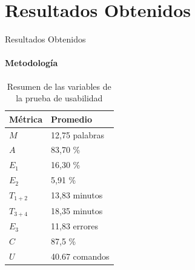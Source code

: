 \section{Resultados Obtenidos}

\begin{frame}{Resultados Obtenidos}
\framesubtitle{Metodolog\'ia}

\begin{table}[H]
\centering
\footnotesize
\caption{Resumen de las variables de la prueba de usabilidad}
\begin{tabular}{|p{1.2cm}|p{2.4cm}|}
\hline
M\'etrica  &   Promedio \\
\hline
$M$ &       12,75  palabras  \\
$A$  &      83,70 \%     \\
$E_1$ &     16,30 \%  \\
$E_2$  &    5,91  \%  \\
$T_{1+2}$ & 13,83  minutos  \\
$T_{3+4}$ & 18,35  minutos  \\
$E_3$ &     11,83  errores  \\
$C$ &       87,5   \%  \\
$U$ &       40.67  comandos  \\
\hline  
\end{tabular}
\label{sec:tabla-resumen-prueba}
\end{table}

\end{frame}

